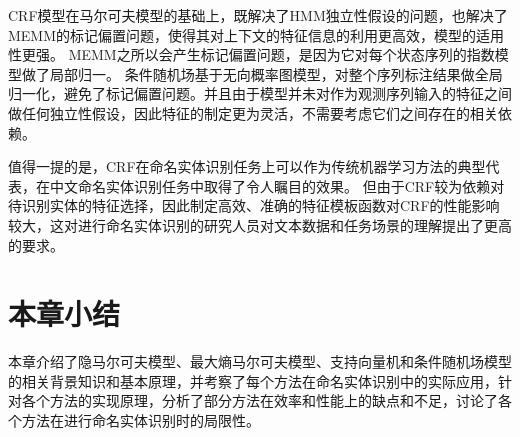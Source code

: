 CRF模型在马尔可夫模型的基础上，既解决了HMM独立性假设的问题，也解决了MEMM的标记偏置问题，使得其对上下文的特征信息的利用更高效，模型的适用性更强。
MEMM之所以会产生标记偏置问题，是因为它对每个状态序列的指数模型做了局部归一。
条件随机场基于无向概率图模型，对整个序列标注结果做全局归一化，避免了标记偏置问题。并且由于模型并未对作为观测序列输入的特征之间做任何独立性假设，因此特征的制定更为灵活，不需要考虑它们之间存在的相关依赖。

值得一提的是，CRF在命名实体识别任务上可以作为传统机器学习方法的典型代表，在中文命名实体识别任务中取得了令人瞩目的效果。
但由于CRF较为依赖对待识别实体的特征选择，因此制定高效、准确的特征模板函数对CRF的性能影响较大，这对进行命名实体识别的研究人员对文本数据和任务场景的理解提出了更高的要求。

\section{本章小结}
本章介绍了隐马尔可夫模型、最大熵马尔可夫模型、支持向量机和条件随机场模型的相关背景知识和基本原理，并考察了每个方法在命名实体识别中的实际应用，针对各个方法的实现原理，分析了部分方法在效率和性能上的缺点和不足，讨论了各个方法在进行命名实体识别时的局限性。

